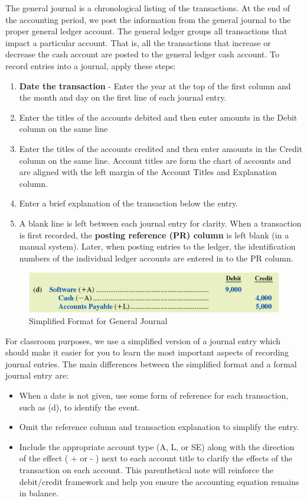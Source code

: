 \documentclass[../main.tex]{subfiles}
\begin{document}
	The general journal is a chronological listing of the transactions. At the 
	end of the accounting period, we post the information from the general 
	journal to the proper general ledger account. The general ledger groups all 
	transactions that impact a particular account. That is, all the 
	transactions that increase or decrease the cash account are posted to the 
	general ledger cash account. To record entries into a journal, apply these 
	steps:
	\begin{enumerate}[noitemsep]
		\item \textbf{Date the transaction} -  Enter the year at the top of the 
		first column and the month and day on the first line of each journal 
		entry.
		\item Enter the titles of the accounts debited and then enter amounts 
		in the Debit column on the same line
		\item Enter the titles of the accounts credited and then enter amounts 
		in the Credit column on the same line. Account titles are form the 
		chart of accounts and are aligned with the left margin of the Account 
		Titles and Explanation column.
		\item Enter a brief explanation of the transaction below the entry.  
		\item A blank line is left between each journal entry for clarity. When 
		a transaction is first recorded, the \textbf{posting reference (PR) 
		column} is left blank (in a manual system). Later, when posting entries 
		to the ledger, the identification numbers of the individual ledger 
		accounts are entered in to the PR column.
	\end{enumerate}

	\begin{figure}[ht]
		\centering
		\includegraphics[width=1\columnwidth]{images/c2/simplied_journal_format.png}
		\caption{Simplified Format for General Journal}
	\end{figure}
	For classroom purposes, we use a simplified version of a journal entry 
	which should make it easier for you to learn the most important aspects of 
	recording journal entries. The main differences between the simplified 
	format and a formal journal entry are:
	\begin{itemize}[noitemsep]
		\item When a date is not given, use some form of reference for each 
		transaction, such as (d), to identify the event.
		\item Omit the reference column and transaction explanation to simplify 
		the entry.
		\item Include the appropriate account type (A, L, or SE) along with the 
		direction of the effect ( + or - ) next to each account title to 
		clarify the effects of the transaction on each account. This 
		parenthetical note will reinforce the debit/credit framework and help 
		you ensure the accounting equation remains in balance.
	\end{itemize}
\end{document}
